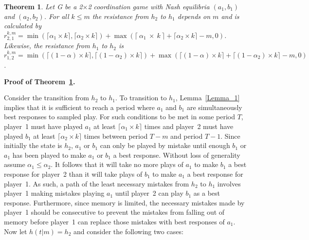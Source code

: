 \documentclass[11.5pt]{article}
\newtheorem{theorem}{Theorem}
\begin{document}
\begin{theorem}\label{Theorem_3}
Let G be a 2$\times$2 coordination game with Nash equilibria $(a_1,b_1)$ and $(a_2,b_2)$. For all $k \leq m$ the resistance from $h_2$ to $h_1$ depends on $m$ and is calculated by $r_{2,1}^{k,m} = \min(\lceil \alpha_1 \times k \rceil,\lceil \alpha_2 \times k \rceil)+\max(\lceil~\alpha_1~\times~k~\rceil+\lceil \alpha_2 \times k \rceil-m,0)$. Likewise, the resistance from $h_1$ to $h_2$ is $r^{k,m}_{1,2}=\min(\lceil (1-\alpha) \times k \rceil, \lceil (1-\alpha_2) \times  k \rceil)+\max(\lceil (1-\alpha) \times k \rceil+\lceil (1-\alpha_2) \times k \rceil-m,0)$.
\end{theorem}


\textbf{Proof of Theorem~\ref{Theorem_3}.}


Consider the transition from $h_2$ to $h_1$. To transition to $h_1$, Lemma~\ref{Lemma_1} implies that it is sufficient to reach a period where $a_1$ and $b_1$ are simultaneously best responses to sampled play. For such conditions to be met in some period $T$, player~1 must have played $a_1$ at least $\lceil \alpha_1 \times k \rceil$ times and player~2 must have played $b_1$ at least $\lceil \alpha_2 \times k \rceil$ times between period $T-m$ and period $T-1$. Since initially the state is $h_2$, $a_1$ or $b_1$ can only be played by mistake until enough $b_1$ or $a_1$ has been played to make $a_1$ or $b_1$ a best response. Without loss of generality assume $\alpha_1 \leq \alpha_2$. It follows that it will take no more plays of $a_1$ to make $b_1$ a best response for player~2 than it will take plays of $b_1$ to make $a_1$ a best response for player~1. As such, a path of the least necessary mistakes from $h_2$ to $h_1$ involves player~1 making mistakes playing $a_1$ until player~2 can play $b_1$ as a best response. Furthermore, since memory is limited, the necessary mistakes made by player~1 should be consecutive to prevent the mistakes from falling out of memory before player~1 can replace those mistakes with best responses of $a_1$. Now let $h(t|m) = h_2$ and consider the following two cases:
%
\end{document}
